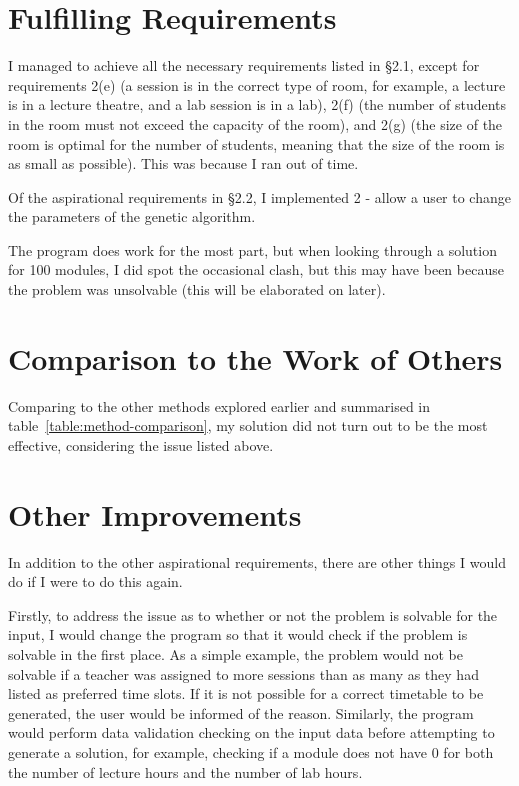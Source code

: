 \section{Fulfilling Requirements}

I managed to achieve all the necessary requirements listed in \S2.1, except for
requirements 2(e) (a session is in the correct type of room, for example, a
lecture is in a lecture theatre, and a lab session is in a lab), 2(f) (the 
number of students in the room must not exceed the capacity of the room), and
2(g) (the size of the room is optimal for the number of students, meaning that
the size of the room is as small as possible).
This was because I ran out of time.

Of the aspirational requirements in \S2.2, I implemented 2 - allow a user to
change the parameters of the genetic algorithm.

The program does work for the most part, but when looking through a solution for
100 modules, I did spot the occasional clash, but this may have been because
the problem was unsolvable (this will be elaborated on later).

\section{Comparison to the Work of Others}

Comparing to the other methods explored earlier and summarised in 
table~\ref*{table:method-comparison}, my solution did not turn out to be the
most effective, considering the issue listed above.

\section{Other Improvements}

In addition to the other aspirational requirements, there are other things I 
would do if I were to do this again.

Firstly, to address the issue as to whether or not the problem is solvable for
the input, I would change the program so that it would check if the problem is
solvable in the first place. 
As a simple example, the problem would not be solvable if a teacher was assigned
to more sessions than as many as they had listed as preferred time slots.
If it is not possible for a correct timetable to be generated, the user would
be informed of the reason.
Similarly, the program would perform data validation checking on the input data
before attempting to generate a solution, for example, checking if a module does
not have 0 for both the number of lecture hours and the number of lab hours. 

